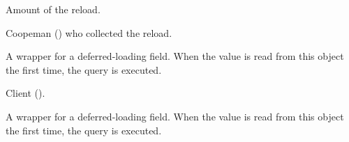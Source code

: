 \documentclass[letterpaper,10pt,english]{sphinxmanual}
\begin{document}
\begin{fulllineitems}
\begin{fulllineitems}
\label{\detokenize{modules/models:gestion.models.Reload.amount}}
Amount of the reload.

\end{fulllineitems}


\begin{fulllineitems}
\label{\detokenize{modules/models:gestion.models.Reload.coopeman}}
Coopeman () who collected the reload.

\end{fulllineitems}


\begin{fulllineitems}
\label{\detokenize{modules/models:gestion.models.Reload.coopeman_id}}
A wrapper for a deferred-loading field. When the value is read from this
object the first time, the query is executed.

\end{fulllineitems}


\begin{fulllineitems}
\label{\detokenize{modules/models:gestion.models.Reload.customer}}
Client ().

\end{fulllineitems}


\begin{fulllineitems}
\label{\detokenize{modules/models:gestion.models.Reload.customer_id}}
A wrapper for a deferred-loading field. When the value is read from this
object the first time, the query is executed.


\end{fulllineitems}
\end{fulllineitems}
\end{document}
